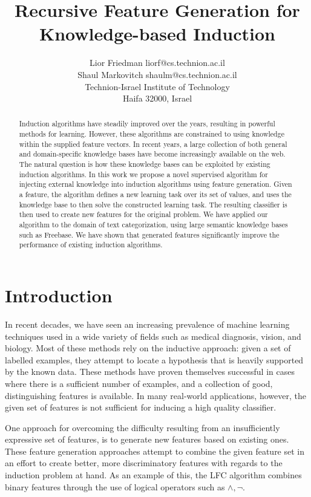 \documentclass[twoside,11pt]{article}
\title{Recursive Feature Generation for Knowledge-based Induction}
\author{\name Lior Friedman \email liorf@cs.technion.ac.il \\
	\name Shaul Markovitch \email shaulm@cs.technion.ac.il \\
	\addr Technion-Israel Institute of Technology\\
	Haifa 32000, Israel
	}
\theoremstyle{definition}
\begin{document}
\maketitle

\begin{abstract}
  Induction algorithms have steadily improved over the years, resulting in powerful methods for learning. However, these algorithms are constrained to using knowledge within the supplied feature vectors. In recent years, a large collection of both general and domain-specific knowledge bases have become increasingly available on the web. The natural question is how these knowledge bases can be exploited by existing induction algorithms.
  In this work we propose a novel supervised algorithm for injecting external knowledge into induction algorithms using feature generation. Given a feature, the algorithm defines a new learning task over its set of values, and uses the knowledge base to then solve the constructed learning task. The resulting classifier is then used to create new features for the original problem.
  We have applied our algorithm to the domain of text categorization, using large semantic knowledge bases such as Freebase. We have shown that generated features significantly improve the performance of existing induction algorithms.
\end{abstract}

\section{Introduction}
\label{sec:Intro}
In recent decades, we have seen an increasing prevalence of machine learning techniques used in a wide variety of fields such as medical diagnosis, vision, and biology.
Most of these methods rely on the inductive approach: given a set of labelled examples, they attempt to locate a hypothesis that is heavily supported by the known data. These methods have proven themselves successful in cases where there is a sufficient number of examples, and a collection of good,
distinguishing features is available.
In many real-world applications, however, the given set of features is not sufficient for inducing a high quality classifier.

One approach for overcoming the difficulty resulting from an insufficiently expressive set of features, is to generate new features based on existing ones. 
These feature generation approaches attempt to combine the given feature set in an effort to create better, more discriminatory features with regards to the induction problem at hand. As an example of this, the LFC algorithm  combines binary features through the use of logical operators such as $\land ,\lnot$.
\end{document}
